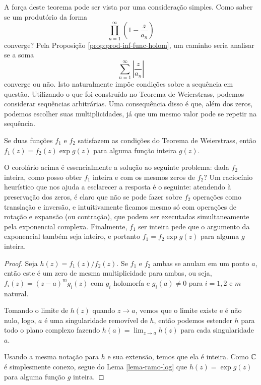     A força deste teorema pode ser vista por uma consideração simples. 
    Como saber se um produtório da forma
    $$\prod_{n=1}^{\infty} \left( 1 - \frac{z}{a_n} \right)$$
    converge? Pela Proposição \ref{prop:prod-inf-func-holom}, 
    um caminho seria analisar se a soma 
    \[
    \sum_{n=1}^{\infty} \left | \frac{z}{a_n} \right |
    \]
    converge ou não. Isto naturalmente impõe condições sobre a sequência em questão. 
    Utilizando o que foi construído no Teorema de Weierstrass, 
    podemos considerar sequências arbitrárias. Uma consequência disso é que, 
    além dos zeros, podemos escolher suas multiplicidades, 
    já que um mesmo valor pode se repetir na sequência.
    \begin{corolario}
    Se duas funções $f_1$ e $f_2$ satisfazem as 
    condições do Teorema de Weierstrass, então $f_1(z) = f_2(z)\exp{g(z)}$ 
    para alguma função inteira $g(z)$. 
    \end{corolario}
    \begin{observacao}
        O corolário acima é essencialmente a solução ao seguinte problema:
        dada $f_2$ inteira, como posso obter $f_1$ inteira e com os mesmos zeros de $f_2$?
        Um raciocínio heurístico que nos ajuda a esclarecer a resposta é o seguinte:
        atendendo à preservação dos zeros, é claro que não se pode fazer sobre $f_2$ operações como translação e inversão, e intuitivamente ficamos mesmo só com operações de rotação e expansão (ou contração), que podem ser executadas simultaneamente pela exponencial complexa.
        Finalmente, $f_1$ ser inteira pede que o argumento da exponencial também seja inteiro, e portanto $f_1=f_2 \exp g(z)$ para alguma $g$ inteira.
    \end{observacao}
    \begin{proof}
    Seja $h(z) = f_1(z)/f_2(z)$. Se $f_1$ e $f_2$ 
    ambas se anulam em um ponto $a$, então este é um zero de mesma multiplicidade para ambas, 
    ou seja, $f_i(z) = (z-a)^mg_i(z)$ com $g_i$ holomorfa e 
    $g_i(a) \neq 0$ para  $i = 1,2$ e $m$ natural. 
    
    Tomando o limite de $h(z)$ quando $z \to a$, 
    vemos que o limite existe e é não nulo, logo, 
    $a$ é uma singularidade removível de $h$, então podemos estender $h$ 
    para todo o plano complexo fazendo 
    $h(a) = \lim_{z \to a} h(z)$ para cada singularidade $a$.
    
    Usando a mesma notação para $h$ e sua extensão, temos que ela é inteira. 
    Como $\mathbb{C}$ é simplesmente conexo, 
    segue do Lema \ref{lema-ramo-log} que $h(z) = \exp{g(z)}$ 
    para alguma função $g$ inteira.
    \end{proof}
